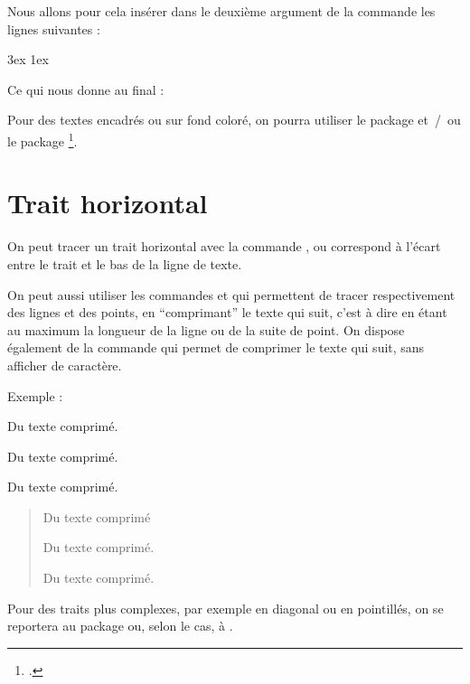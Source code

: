 Nous allons pour cela insérer dans le deuxième argument de la commande  les lignes suivantes :

\begin{latexcode}
\leftmargin 3ex
\rightmargin 1ex
\itshape
\end{latexcode}

Ce qui nous donne au final :

\begin{latexcode}
\makeatletter
\newenvironment{exemple}
               {\list{}{\listparindent 1.5em%
                        \itemindent    \listparindent
                        \leftmargin 3ex
            \rightmargin 1ex
            \itshape
                        \parsep        \z@ \@plus\p@}%
                \item\relax}
               {\endlist}
\makeatother
\end{latexcode}

\begin{plusloins}
Pour des textes encadrés ou sur fond coloré, on pourra utiliser le package  et~/~ou le package \footcites[On peut également consulter][qui regorge d'exemple pratique de \enquote{mise en boîte}]{frama}[on consultera en particulier][]{frama_boites}. 
\end{plusloins}

\section{Trait horizontal}\label{filets}

On peut tracer un trait horizontal avec la commande , ou  correspond à l'écart entre le trait et le bas de la ligne de texte.

On peut aussi utiliser les commandes  et  qui permettent de tracer respectivement des lignes et des points, en \enquote{comprimant} le texte qui suit, c'est à dire en étant au maximum la longueur de la ligne ou de la suite de point. On dispose également de la commande \label{hfill} qui permet de comprimer le texte qui suit, sans afficher de caractère.

Exemple :

\begin{latexcode}
\hfill Du texte comprimé.

\hrulefill Du texte comprimé.

\dotfill Du texte comprimé.
\end{latexcode}

\begin{quotation}
\hfill Du texte comprimé

\hrulefill Du texte comprimé.

\dotfill Du texte comprimé.
\end{quotation}

Pour des traits plus complexes, par exemple en diagonal ou en pointillés, on se reportera au package  ou, selon le cas, à . 



